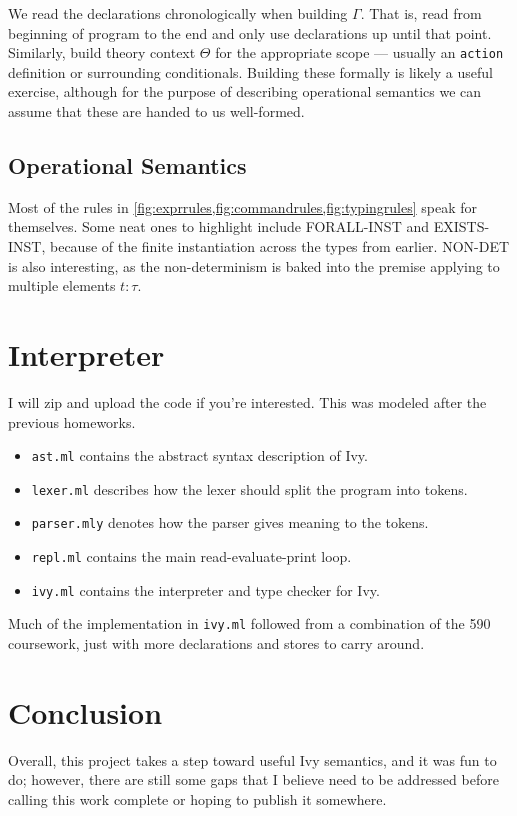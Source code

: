 \documentclass{article}
\begin{document}
\begin{multicols}{2}
    We read the declarations chronologically when building $\Gamma$. That is, read from beginning of program to the end and only use declarations up until that point. Similarly, build theory context $\Theta$ for the appropriate scope --- usually an \texttt{action} definition or surrounding conditionals. Building these formally is likely a useful exercise, although for the purpose of describing operational semantics we can assume that these are handed to us well-formed.

    \subsection{Operational Semantics}

    Most of the rules in \cref{fig:exprrules,fig:commandrules,fig:typingrules} speak for themselves. Some neat ones to highlight include FORALL-INST and EXISTS-INST, because of the finite instantiation across the types from earlier. NON-DET is also interesting, as the non-determinism is baked into the premise applying to multiple elements $t : \tau$.

    \section{Interpreter}
    I will zip and upload the code if you're interested. This was modeled after the previous homeworks.

    \begin{itemize}
        \item \texttt{ast.ml} contains the abstract syntax description of Ivy.
        \item \texttt{lexer.ml} describes how the lexer should split the program into tokens.
        \item \texttt{parser.mly} denotes how the parser gives meaning to the tokens.
        \item \texttt{repl.ml} contains the main read-evaluate-print loop.
        \item \texttt{ivy.ml} contains the interpreter and type checker for Ivy.
    \end{itemize}

    Much of the implementation in \texttt{ivy.ml} followed from a combination of the 590 coursework, just with more declarations and stores to carry around.

    \section{Conclusion}
    Overall, this project takes a step toward useful Ivy semantics, and it was fun to do; however, there are still some gaps that I believe need to be addressed before calling this work complete or hoping to publish it somewhere.


\end{multicols}
\end{document}
